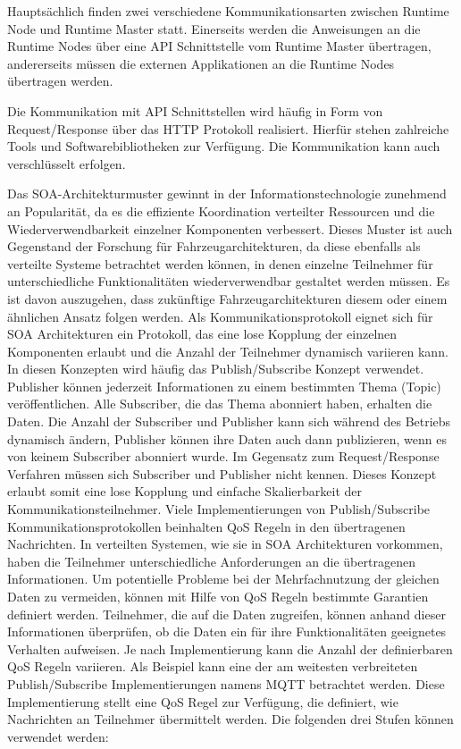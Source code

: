 Hauptsächlich finden zwei verschiedene Kommunikationsarten zwischen Runtime Node und Runtime Master statt. Einerseits werden die Anweisungen an die Runtime Nodes über eine \gls{API} Schnittstelle vom Runtime Master übertragen, andererseits müssen die externen Applikationen an die Runtime Nodes übertragen werden. 

Die Kommunikation mit \gls{API} Schnittstellen wird häufig in Form von Request/Response über das \gls{HTTP} Protokoll realisiert. Hierfür stehen zahlreiche Tools und Softwarebibliotheken zur Verfügung. Die Kommunikation kann auch verschlüsselt erfolgen. 

Das \gls{SOA}-Architekturmuster gewinnt in der Informationstechnologie zunehmend an Popularität, da es die effiziente Koordination verteilter Ressourcen und die Wiederverwendbarkeit einzelner Komponenten verbessert. Dieses Muster ist auch Gegenstand der Forschung für Fahrzeugarchitekturen, da diese ebenfalls als verteilte Systeme betrachtet werden können, in denen einzelne Teilnehmer für unterschiedliche Funktionalitäten wiederverwendbar gestaltet werden müssen. Es ist davon auszugehen, dass zukünftige Fahrzeugarchitekturen diesem oder einem ähnlichen Ansatz folgen werden. Als Kommunikationsprotokoll eignet sich für \gls{SOA} Architekturen ein Protokoll, das eine lose Kopplung der einzelnen Komponenten erlaubt und die Anzahl der Teilnehmer dynamisch variieren kann. In diesen Konzepten wird häufig das Publish/Subscribe Konzept verwendet. Publisher können jederzeit Informationen zu einem bestimmten Thema (Topic) veröffentlichen. Alle Subscriber, die das Thema abonniert haben, erhalten die Daten. Die Anzahl der Subscriber und Publisher kann sich während des Betriebs dynamisch ändern, Publisher können ihre Daten auch dann publizieren, wenn es von keinem Subscriber abonniert wurde. Im Gegensatz zum Request/Response Verfahren müssen sich Subscriber und Publisher nicht kennen. Dieses Konzept erlaubt somit eine lose Kopplung und einfache Skalierbarkeit der Kommunikationsteilnehmer. Viele Implementierungen von Publish/Subscribe Kommunikationsprotokollen beinhalten \gls{QoS} Regeln in den übertragenen Nachrichten. In verteilten Systemen, wie sie in \gls{SOA} Architekturen vorkommen, haben die Teilnehmer unterschiedliche Anforderungen an die übertragenen Informationen. Um potentielle Probleme bei der Mehrfachnutzung der gleichen Daten zu vermeiden, können mit Hilfe von \gls{QoS} Regeln bestimmte Garantien definiert werden. Teilnehmer, die auf die Daten zugreifen, können anhand dieser Informationen überprüfen, ob die Daten ein für ihre Funktionalitäten geeignetes Verhalten aufweisen. Je nach Implementierung kann die Anzahl der definierbaren \gls{QoS} Regeln variieren. Als Beispiel kann eine der am weitesten verbreiteten Publish/Subscribe Implementierungen namens \gls{MQTT} betrachtet werden. Diese Implementierung stellt eine \gls{QoS} Regel zur Verfügung, die definiert, wie Nachrichten an Teilnehmer übermittelt werden. Die folgenden drei Stufen können verwendet werden:

